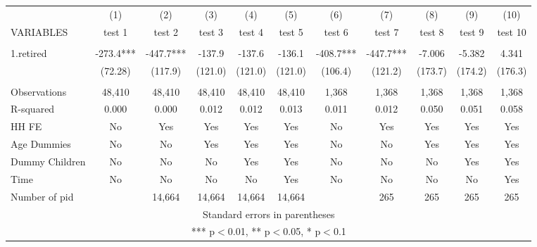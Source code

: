 \begin{tabular}{lcccccccccc} \hline
 & (1) & (2) & (3) & (4) & (5) & (6) & (7) & (8) & (9) & (10) \\
VARIABLES & test 1 & test 2 & test 3 & test 4 & test 5 & test 6 & test 7 & test 8 & test 9 & test 10 \\ \hline
 &  &  &  &  &  &  &  &  &  &  \\
1.retired & -273.4*** & -447.7*** & -137.9 & -137.6 & -136.1 & -408.7*** & -447.7*** & -7.006 & -5.382 & 4.341 \\
 & (72.28) & (117.9) & (121.0) & (121.0) & (121.0) & (106.4) & (121.2) & (173.7) & (174.2) & (176.3) \\
 &  &  &  &  &  &  &  &  &  &  \\
Observations & 48,410 & 48,410 & 48,410 & 48,410 & 48,410 & 1,368 & 1,368 & 1,368 & 1,368 & 1,368 \\
R-squared & 0.000 & 0.000 & 0.012 & 0.012 & 0.013 & 0.011 & 0.012 & 0.050 & 0.051 & 0.058 \\
HH FE & No & Yes & Yes & Yes & Yes & No & Yes & Yes & Yes & Yes \\
Age Dummies & No & No & Yes & Yes & Yes & No & No & Yes & Yes & Yes \\
Dummy Children & No & No & No & Yes & Yes & No & No & No & Yes & Yes \\
Time & No & No & No & No & Yes & No & No & No & No & Yes \\
 Number of pid &  & 14,664 & 14,664 & 14,664 & 14,664 &  & 265 & 265 & 265 & 265 \\ \hline
\multicolumn{11}{c}{ Standard errors in parentheses} \\
\multicolumn{11}{c}{ *** p$<$0.01, ** p$<$0.05, * p$<$0.1} \\
\end{tabular}
